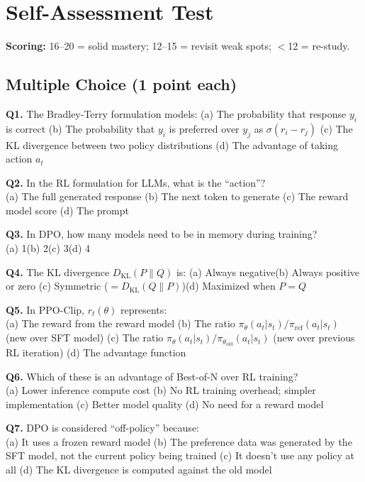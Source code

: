 \documentclass[11pt, a4paper]{article}
\begin{document}
\newpage
\section{Self-Assessment Test}

\textbf{Scoring:} 16--20 = solid mastery; 12--15 = revisit weak spots; $<$12 = re-study.

\subsection*{Multiple Choice (1 point each)}

\textbf{Q1.} The Bradley-Terry formulation models:
(a) The probability that response $y_i$ is correct\quad
(b) The probability that $y_i$ is preferred over $y_j$ as $\sigma(r_i - r_j)$\quad
(c) The KL divergence between two policy distributions\quad
(d) The advantage of taking action $a_t$

\textbf{Q2.} In the RL formulation for LLMs, what is the ``action''?\\
(a) The full generated response\quad
(b) The next token to generate\quad
(c) The reward model score\quad
(d) The prompt

\textbf{Q3.} In DPO, how many models need to be in memory during training?\\
(a) 1\quad (b) 2\quad (c) 3\quad (d) 4

\textbf{Q4.} The KL divergence $D_{\text{KL}}(P \| Q)$ is:
(a) Always negative\quad (b) Always positive or zero\quad
(c) Symmetric ($= D_{\text{KL}}(Q \| P)$)\quad (d) Maximized when $P = Q$

\textbf{Q5.} In PPO-Clip, $r_t(\theta)$ represents:\\
(a) The reward from the reward model\quad
(b) The ratio $\pi_\theta(a_t|s_t) / \pi_{\text{ref}}(a_t|s_t)$ (new over SFT model)\quad
(c) The ratio $\pi_\theta(a_t|s_t) / \pi_{\theta_\text{old}}(a_t|s_t)$ (new over previous RL iteration)\quad
(d) The advantage function

\textbf{Q6.} Which of these is an advantage of Best-of-N over RL training?\\
(a) Lower inference compute cost\quad
(b) No RL training overhead; simpler implementation\quad
(c) Better model quality\quad
(d) No need for a reward model

\textbf{Q7.} DPO is considered ``off-policy'' because:\\
(a) It uses a frozen reward model\quad
(b) The preference data was generated by the SFT model, not the current policy being trained\quad
(c) It doesn't use any policy at all\quad
(d) The KL divergence is computed against the old model
\end{document}
